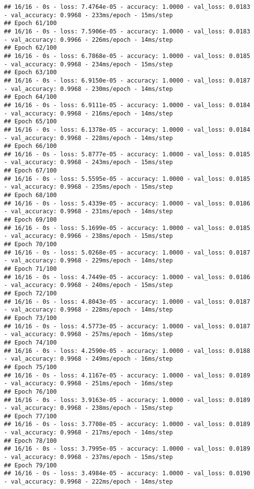 \documentclass[
]{article}
\begin{document}
\begin{verbatim}
## 16/16 - 0s - loss: 7.4764e-05 - accuracy: 1.0000 - val_loss: 0.0183 - val_accuracy: 0.9968 - 233ms/epoch - 15ms/step
## Epoch 61/100
## 16/16 - 0s - loss: 7.5906e-05 - accuracy: 1.0000 - val_loss: 0.0183 - val_accuracy: 0.9966 - 226ms/epoch - 14ms/step
## Epoch 62/100
## 16/16 - 0s - loss: 6.7868e-05 - accuracy: 1.0000 - val_loss: 0.0185 - val_accuracy: 0.9968 - 234ms/epoch - 15ms/step
## Epoch 63/100
## 16/16 - 0s - loss: 6.9150e-05 - accuracy: 1.0000 - val_loss: 0.0187 - val_accuracy: 0.9968 - 230ms/epoch - 14ms/step
## Epoch 64/100
## 16/16 - 0s - loss: 6.9111e-05 - accuracy: 1.0000 - val_loss: 0.0184 - val_accuracy: 0.9968 - 216ms/epoch - 14ms/step
## Epoch 65/100
## 16/16 - 0s - loss: 6.1378e-05 - accuracy: 1.0000 - val_loss: 0.0184 - val_accuracy: 0.9968 - 228ms/epoch - 14ms/step
## Epoch 66/100
## 16/16 - 0s - loss: 5.8777e-05 - accuracy: 1.0000 - val_loss: 0.0185 - val_accuracy: 0.9968 - 243ms/epoch - 15ms/step
## Epoch 67/100
## 16/16 - 0s - loss: 5.5595e-05 - accuracy: 1.0000 - val_loss: 0.0185 - val_accuracy: 0.9968 - 235ms/epoch - 15ms/step
## Epoch 68/100
## 16/16 - 0s - loss: 5.4339e-05 - accuracy: 1.0000 - val_loss: 0.0186 - val_accuracy: 0.9968 - 231ms/epoch - 14ms/step
## Epoch 69/100
## 16/16 - 0s - loss: 5.1699e-05 - accuracy: 1.0000 - val_loss: 0.0185 - val_accuracy: 0.9966 - 238ms/epoch - 15ms/step
## Epoch 70/100
## 16/16 - 0s - loss: 5.0268e-05 - accuracy: 1.0000 - val_loss: 0.0187 - val_accuracy: 0.9968 - 229ms/epoch - 14ms/step
## Epoch 71/100
## 16/16 - 0s - loss: 4.7449e-05 - accuracy: 1.0000 - val_loss: 0.0186 - val_accuracy: 0.9968 - 240ms/epoch - 15ms/step
## Epoch 72/100
## 16/16 - 0s - loss: 4.8043e-05 - accuracy: 1.0000 - val_loss: 0.0187 - val_accuracy: 0.9968 - 228ms/epoch - 14ms/step
## Epoch 73/100
## 16/16 - 0s - loss: 4.5773e-05 - accuracy: 1.0000 - val_loss: 0.0187 - val_accuracy: 0.9968 - 257ms/epoch - 16ms/step
## Epoch 74/100
## 16/16 - 0s - loss: 4.2590e-05 - accuracy: 1.0000 - val_loss: 0.0188 - val_accuracy: 0.9968 - 249ms/epoch - 16ms/step
## Epoch 75/100
## 16/16 - 0s - loss: 4.1167e-05 - accuracy: 1.0000 - val_loss: 0.0189 - val_accuracy: 0.9968 - 251ms/epoch - 16ms/step
## Epoch 76/100
## 16/16 - 0s - loss: 3.9163e-05 - accuracy: 1.0000 - val_loss: 0.0189 - val_accuracy: 0.9968 - 238ms/epoch - 15ms/step
## Epoch 77/100
## 16/16 - 0s - loss: 3.7708e-05 - accuracy: 1.0000 - val_loss: 0.0189 - val_accuracy: 0.9968 - 217ms/epoch - 14ms/step
## Epoch 78/100
## 16/16 - 0s - loss: 3.7995e-05 - accuracy: 1.0000 - val_loss: 0.0189 - val_accuracy: 0.9968 - 237ms/epoch - 15ms/step
## Epoch 79/100
## 16/16 - 0s - loss: 3.4984e-05 - accuracy: 1.0000 - val_loss: 0.0190 - val_accuracy: 0.9968 - 222ms/epoch - 14ms/step

\end{verbatim}
\end{document}
